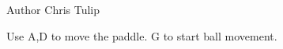 \begin{DoxyAuthor}{Author}
Chris Tulip
\end{DoxyAuthor}
Use A,D to move the paddle. G to start ball movement. 